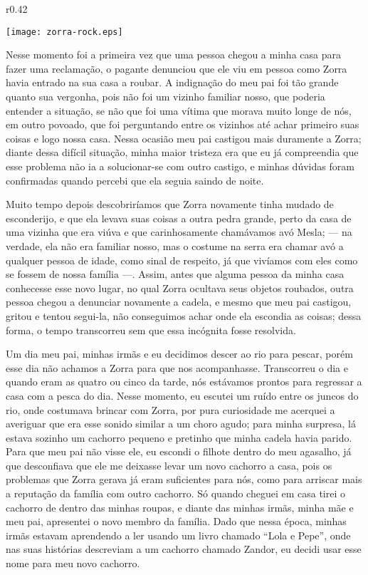 \begin{wrapfigure}{r}{0.42\textwidth}
  \begin{center}
  \vspace{-10pt}
    \texttt{[image: zorra-rock.eps]}
  \end{center}
  \vspace{-20pt}
\end{wrapfigure}
Nesse momento foi a primeira vez que uma pessoa chegou a minha casa para fazer uma reclamação, o pagante denunciou que ele viu em pessoa como Zorra havia entrado na sua casa a roubar. 
A indignação do meu pai foi tão grande quanto sua vergonha, pois não foi um vizinho familiar nosso, que poderia entender a situação, se não que foi uma vítima que morava muito longe de nós, em outro povoado, que foi perguntando entre os vizinhos até achar primeiro suas coisas e logo nossa casa.
Nessa ocasião meu pai castigou mais duramente a Zorra; diante dessa difícil situação, minha maior tristeza era que eu já compreendia que esse problema não ia a solucionar-se com outro castigo, e minhas dúvidas foram confirmadas quando percebi que ela seguia saindo de noite. 

Muito tempo depois descobriríamos que Zorra novamente tinha mudado de esconderijo, e que ela levava suas coisas a outra pedra grande, perto da casa de uma vizinha que era viúva e que carinhosamente chamávamos avó Mesla; --- na verdade, ela não era familiar nosso, mas o costume na serra era chamar avó a qualquer pessoa de idade, como sinal de respeito, já que vivíamos com eles como se fossem de nossa família ---.
Assim, antes que alguma pessoa da minha casa conhecesse esse novo lugar, no qual Zorra ocultava seus objetos roubados, outra pessoa chegou a denunciar novamente a cadela, e mesmo que meu pai castigou, gritou e tentou segui-la, não conseguimos achar onde ela escondia as coisas; dessa forma, o tempo transcorreu sem que essa incógnita fosse resolvida. 

Um dia meu pai, minhas irmãs e eu decidimos descer ao rio para pescar, porém esse dia não achamos a Zorra para que nos acompanhasse. Transcorreu o dia e quando eram as quatro ou cinco da tarde, nós estávamos prontos para regressar a casa com a pesca do dia. Nesse momento, eu escutei um ruído entre os juncos do rio, onde costumava brincar com Zorra, por pura curiosidade me acerquei a averiguar que era esse sonido similar a um choro agudo; para minha surpresa, lá estava sozinho um cachorro pequeno e pretinho que minha cadela havia parido.  
Para que meu pai não visse ele, eu escondi o filhote dentro do meu agasalho, já que desconfiava que ele me deixasse levar um novo cachorro a casa, pois os problemas que Zorra gerava já eram suficientes para nós, como para arriscar mais a reputação da família com outro cachorro.
Só quando cheguei em casa tirei o cachorro de dentro das minhas roupas, e diante das minhas irmãs, minha mãe e meu pai, apresentei o novo membro da família. Dado que nessa época, minhas irmãs estavam aprendendo a ler usando um livro chamado ``Lola e Pepe'', onde nas suas histórias descreviam a um cachorro chamado Zandor, eu decidi usar esse nome para meu novo cachorro. 

